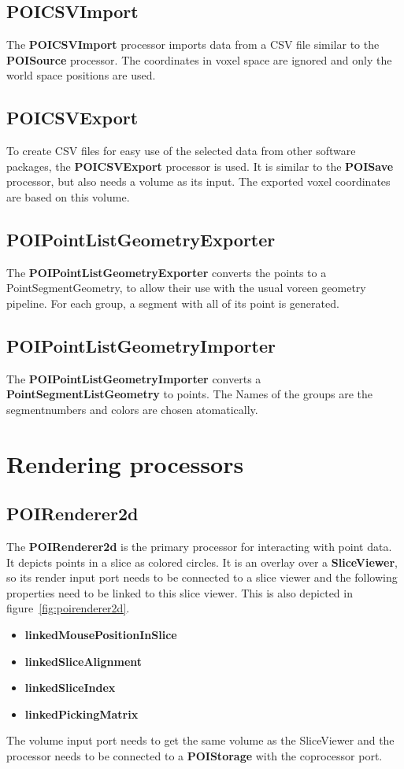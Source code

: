 \documentclass[
    fontsize=12pt,
    paper=a4,
    pagesize=auto,
    parskip=false,
    titlepage=on,
    english
]{scrartcl}
\begin{document}
\subsection{POICSVImport}
The \textbf{POICSVImport} processor imports data from a CSV file similar to the \textbf{POISource} processor. The coordinates in voxel space are ignored and only the world space positions are used.

\subsection{POICSVExport}
To create CSV files for easy use of the selected data from other software packages, the \textbf{POICSVExport} processor is used. It is similar to the \textbf{POISave} processor, but also needs a volume as its input. The exported voxel coordinates are based on this volume.

\subsection{POIPointListGeometryExporter}
The \textbf{POIPointListGeometryExporter} converts the points to a PointSegmentGeometry, to allow their use with the usual voreen geometry pipeline. For each group, a segment with all of its point is generated.

\subsection{POIPointListGeometryImporter}
The \textbf{POIPointListGeometryImporter} converts a \textbf{PointSegmentListGeometry} to points. The Names of the groups are the segmentnumbers and colors are chosen atomatically.

\section{Rendering processors}
\subsection{POIRenderer2d}\label{proc:poirenderer2d}
The \textbf{POIRenderer2d} is the primary processor for interacting with point data. It depicts points in a slice as colored circles. It is an overlay over a \textbf{SliceViewer}, so its render input port needs to be connected to a slice viewer and the following properties need to be linked to this slice viewer. This is also depicted in figure~\ref{fig:poirenderer2d}.
\begin{itemize}
	\item \textbf{linkedMousePositionInSlice}
	\item \textbf{linkedSliceAlignment}
	\item \textbf{linkedSliceIndex}
	\item \textbf{linkedPickingMatrix}
\end{itemize}
The volume input port needs to get the same volume as the SliceViewer and the processor needs to be connected to a \textbf{POIStorage} with the coprocessor port.
\end{document}
